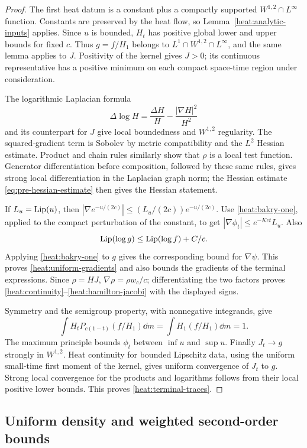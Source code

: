 \begin{proof}
The first heat datum is a constant plus a compactly supported
\(W^{1,2}\cap L^\infty\) function. Constants are preserved by
the heat flow, so Lemma~\ref{heat:analytic-inputs} applies.
Since \(u\) is bounded, \(H_t\) has positive global lower and
upper bounds for fixed \(c\). Thus \(g=f/H_1\) belongs to
\(L^1\cap W^{1,2}\cap L^\infty\), and the same lemma applies
to \(J\). Positivity of the kernel gives \(J>0\); its continuous
representative has a positive minimum on each compact
space-time region under consideration.

The logarithmic Laplacian formula
\[
\Delta\log H=\frac{\Delta H}{H}
-\frac{|\nabla H|^2}{H^2}
\]
and its counterpart for \(J\) give local boundedness and
\(W^{1,2}\) regularity. The squared-gradient term is Sobolev
by metric compatibility and the \(L^2\) Hessian estimate.
Product and chain rules similarly show that
\(\rho\) is a local test function. Generator differentiation
before composition, followed by these same rules, gives strong
local differentiation in the Laplacian graph norm; the Hessian
estimate \eqref{eq:pre-hessian-estimate} then gives the Hessian
statement.

If \(L_u=\operatorname{Lip}(u)\), then
\(|\nabla e^{-u/(2c)}|\le (L_u/(2c))e^{-u/(2c)}\).
Use \eqref{heat:bakry-one}, applied to the compact perturbation
of the constant, to get
\(|\nabla\phi_t|\le e^{-Kct}L_u\).
Also
\[
\operatorname{Lip}(\log g)\le\operatorname{Lip}(\log f)+C/c.
\]
Applying \eqref{heat:bakry-one} to \(g\) gives the corresponding
bound for \(\nabla\psi\). This proves
\eqref{heat:uniform-gradients} and also bounds the gradients of
the terminal expressions. Since \(\rho=HJ\),
\(\nabla\rho=\rho w_c/c\); differentiating the two factors
proves \eqref{heat:continuity}--\eqref{heat:hamilton-jacobi}
with the displayed signs.

Symmetry and the semigroup property, with nonnegative
integrands, give
\[
\int H_tP_{c(1-t)}(f/H_1)\dd m
=\int H_1(f/H_1)\dd m=1.
\]
The maximum principle bounds \(\phi_t\) between \(\inf u\)
and \(\sup u\). Finally \(J_t\to g\) strongly in \(W^{1,2}\).
Heat continuity for bounded Lipschitz data, using the uniform
small-time first moment of the kernel, gives uniform
convergence of \(J_t\) to \(g\). Strong local convergence for
the products and logarithms follows from their local positive
lower bounds. This proves \eqref{heat:terminal-traces}.
\end{proof}

\subsection{Uniform density and weighted second-order bounds}

